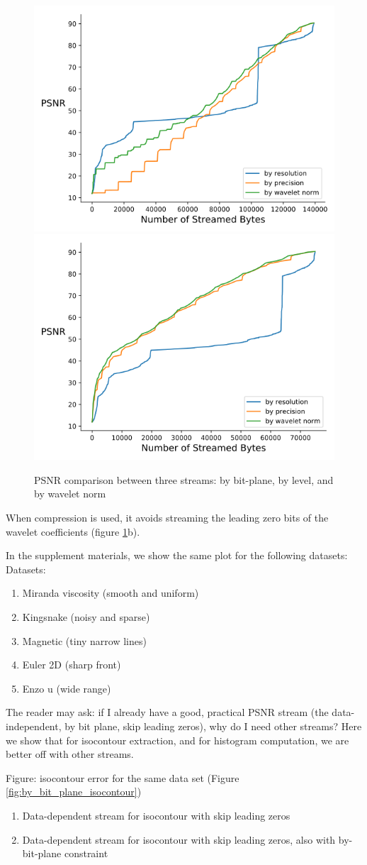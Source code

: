 \begin{figure}[t]
	\centering
	{\includegraphics[width=0.4\linewidth]{resources/rmse-miranda-viscosity.png}}
	{\includegraphics[width=0.4\linewidth]{resources/rmse-miranda-viscosity_slz.png}}
	\caption {PSNR comparison between three streams: by bit-plane, by level, and by wavelet norm}
	\label{fig:psnr_traditional_vs_by_norm_viscosity}
\end{figure}

When compression is used, it avoids streaming the leading zero bits of the wavelet coefficients (figure \ref{fig:psnr_traditional_vs_by_norm_viscosity}b).

In the supplement materials, we show the same plot for the following datasets:
Datasets:
\begin{enumerate}
  \item Miranda viscosity (smooth and uniform)
  \item Kingsnake (noisy and sparse)
  \item Magnetic (tiny narrow lines)
  \item Euler 2D (sharp front)
  \item Enzo u (wide range)
\end{enumerate}

The reader may ask: if I already have a good, practical PSNR stream (the data-independent, by bit plane, skip leading zeros), why do I need other streams? Here we show that for isocontour extraction, and for histogram computation, we are better off with other streams.
  
Figure: isocontour error for the same data set (Figure \ref{fig:by_bit_plane_isocontour})
\begin{enumerate}
  \item Data-dependent stream for isocontour with skip leading zeros
  \item Data-dependent stream for isocontour with skip leading zeros, also with by-bit-plane constraint
\end{enumerate}

